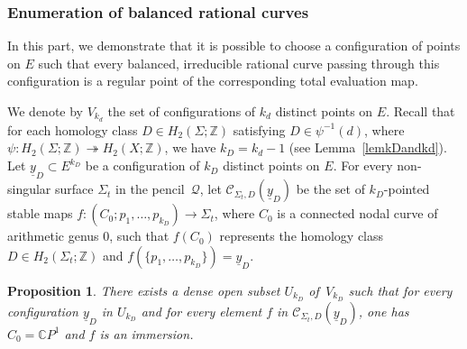 \documentclass[10pt,a4paper]{article}
\numberwithin{equation}{section}
\theoremstyle{definition}
\theoremstyle{plain}
\newtheorem{proposition}[definition]{Proposition}
\theoremstyle{remark}
\newcommand{\Z}{\mathbb{Z}}
\newcommand{\C}{\mathbb{C}}
\begin{document}
\subsubsection{Enumeration of balanced rational curves}

 In this part, we demonstrate that it is possible to choose a configuration of points on $E$ such that every balanced, irreducible rational curve passing through this configuration is a regular point of the corresponding total evaluation map.  
 
     We denote by $V_{k_d}$ the set of configurations of $k_d$ distinct points on $E$. Recall that for each homology class $D\in H_2(\Sigma;\Z)$ satisfying $D\in \psi^{-1}(d)$, where $\psi\colon H_2(\Sigma;\Z)	\twoheadrightarrow H_2(X;\Z)$, we have $k_D=k_d-1$ (see Lemma~\ref{lemkDandkd}).
     Let $\underline{y}_D\subset E^{k_D}$ be a configuration of $k_D$ distinct points on $E$.  For every non-singular surface $\Sigma_t$ in the pencil~$\mathcal{Q}$, let $\mathcal{C}_{\Sigma_t,D}(\underline{y}_D)$ be the set of $k_D$-pointed stable maps $f\colon (C_0;p_1,\ldots,p_{k_D})\to \Sigma_t$, where $C_0$ is a connected nodal curve of arithmetic genus $0$,
   such that $f(C_0)$ represents the homology class $D\in H_2(\Sigma_t;\Z)$  
    and $f(\{p_1,\ldots,p_{k_D}\})=\underline{y}_D$.
    
\begin{proposition} \label{Prop.Modulispace1}
There exists a dense open subset $U_{k_D}$ of\, $V_{k_D}$ such that for every configuration $\underline{y}_D$ in $U_{k_D}$ and for every element $f$ in $\mathcal{C}_{\Sigma_t,D}(\underline{y}_D)$, one has $C_0= \C P^1$ and $f$ is an immersion.
\end{proposition}
\end{document}
